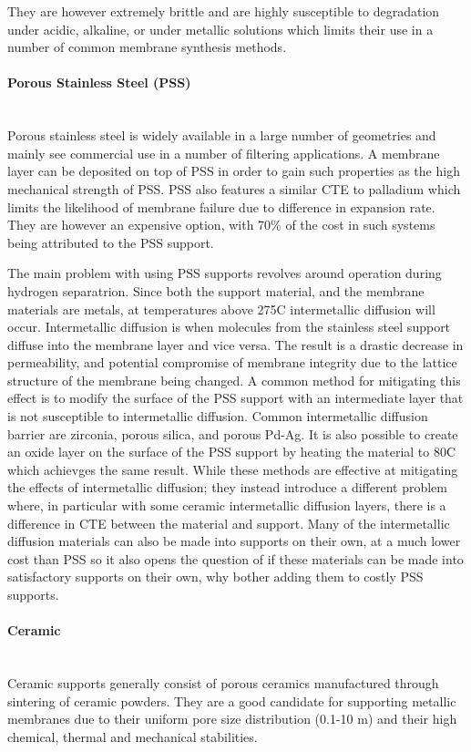 They are however extremely brittle and are highly susceptible to degradation under acidic, alkaline, or under metallic solutions which limits their use in a number of common membrane synthesis methods. \cite{MUKHERJEE2007107}

\paragraph*{Porous Stainless Steel (PSS)}\\
Porous stainless steel is widely available in a large number of geometries and mainly see commercial use in a number of filtering applications. A membrane layer can be deposited on top of PSS in order to gain such properties as the high mechanical strength of PSS. PSS also features a similar CTE to palladium which limits the likelihood of membrane failure due to difference in expansion rate.  They are however an expensive option, with 70\% of the cost in such systems being attributed to the PSS support.

The main problem with using PSS supports revolves around operation during hydrogen separatrion. Since both the support material, and the membrane materials are metals, at temperatures above 275\textdegree C intermetallic diffusion will occur. Intermetallic diffusion is when molecules from the stainless steel support diffuse into the membrane layer and vice versa. The result is a drastic decrease in permeability, and potential compromise of membrane integrity due to the lattice structure of the membrane being changed. A common method for mitigating this effect is to modify the surface of the PSS support with an intermediate layer that is not susceptible to intermetallic diffusion. Common intermetallic diffusion barrier are zirconia, porous silica, and porous Pd-Ag.  \cite{Atsonios2015} It is also possible to create an oxide layer on the surface of the PSS support by heating the material to 80\textdegree C which achievges the same result. While these methods are effective at mitigating the effects of intermetallic diffusion; they instead introduce a different problem where, in particular with some ceramic intermetallic diffusion layers, there is a difference in CTE between the material and support. Many of the intermetallic diffusion materials can also be made into supports on their own, at a much lower cost than PSS so it also opens the question of if these materials can be made into satisfactory supports on their own, why bother adding them to costly PSS supports.

\paragraph*{Ceramic}\\
Ceramic supports generally consist of porous ceramics manufactured through sintering of ceramic powders. They are a good candidate for supporting metallic membranes due to their uniform pore size distribution (0.1-10 \textmu m) and their high chemical, thermal and mechanical stabilities. 


